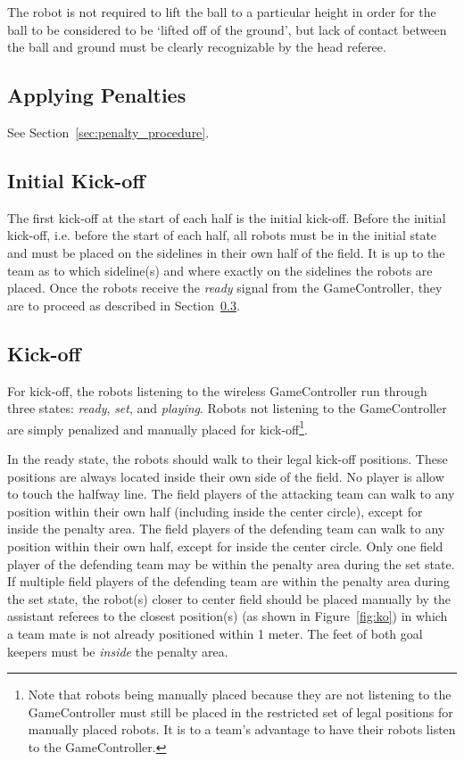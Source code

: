 \documentclass[12pt]{article}
\begin{document}
The robot is not required to lift the ball to a particular height in order for the ball to be considered to be `lifted off of the ground', but lack of contact between the ball and ground must be clearly recognizable by the head referee.

\subsection{Applying Penalties}

See Section~\ref{sec:penalty_procedure}.


\subsection{Initial Kick-off}
\label{sec:initial-kick-off}

The first kick-off at the start of each half is the initial kick-off.
Before the initial kick-off, i.e. before the start of each half, all robots must be in the initial state and must be placed on the sidelines in their own half of the field.
It is up to the team as to which sideline(s) and where exactly on the sidelines the robots are placed.
Once the robots receive the \emph{ready} signal from the GameController, they are to proceed as described in Section~\ref{sec:kick-off}.


\subsection{Kick-off}
\label{sec:kick-off}
For kick-off, the robots listening to the wireless GameController run through three states: \emph{ready}, \emph{set}, and \emph{playing}. Robots not listening to the GameController are simply penalized and manually placed for kick-off\footnote{Note that robots being manually placed because they are not listening to the GameController must still be placed in the restricted set of legal positions for manually placed robots. It is to a team's advantage to have their robots listen to the GameController.}.

In the ready state, the robots should walk to their legal kick-off positions. These positions are always located inside their own side of the field. No player is allow to touch the halfway line.
The field players of the attacking team can walk to any position within their own half (including inside the center circle), except for inside the penalty area.
The field players of the defending team can walk to any position within their own half, except for inside the center circle.  Only one field player of the defending team may be within the penalty area during the set state.  If multiple field players of the defending team are within the penalty area during the set state, the robot(s) closer to center field should be placed manually by the assistant referees to the closest position(s) (as shown in Figure~\ref{fig:ko}) in which a team mate is not already positioned within 1 meter.
The feet of both goal keepers must be \emph{inside} the penalty area.
\end{document}
